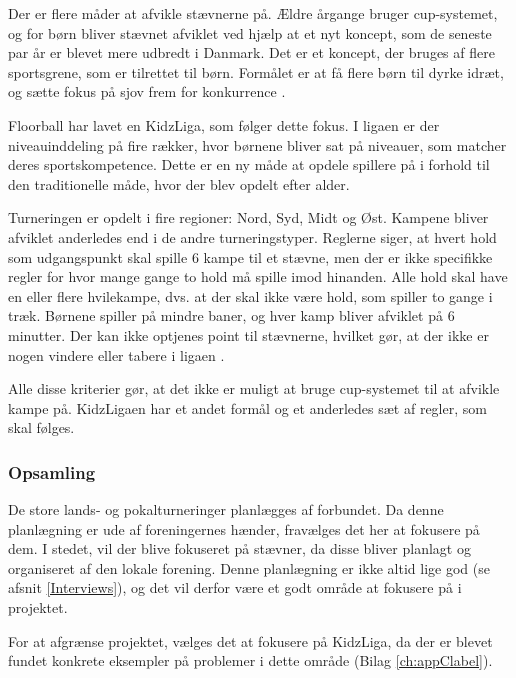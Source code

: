 Der er flere måder at afvikle stævnerne på. Ældre årgange bruger cup-systemet, og for børn bliver stævnet afviklet ved hjælp at et nyt koncept, som de seneste par år er blevet mere udbredt i Danmark. Det er et koncept, der bruges af flere sportsgrene, som er tilrettet til børn. Formålet er at få flere børn til dyrke idræt, og sætte fokus på sjov frem for konkurrence \citep{kidzRegler}.
\par
Floorball har lavet en KidzLiga, som følger dette fokus. I ligaen er der niveauinddeling på fire rækker, hvor børnene bliver sat på niveauer, som matcher deres sportskompetence. Dette er en ny måde at opdele spillere på i forhold til den traditionelle måde, hvor der blev opdelt efter alder.
\par
Turneringen er opdelt i fire regioner: Nord, Syd, Midt og Øst. Kampene bliver afviklet anderledes end i de andre turneringstyper. Reglerne siger, at hvert hold som udgangspunkt skal spille 6 kampe til et stævne, men der er ikke specifikke regler for hvor mange gange to hold må spille imod hinanden. Alle hold skal have en eller flere hvilekampe, dvs. at der skal ikke være hold, som spiller to gange i træk. Børnene spiller på mindre baner, og hver kamp bliver afviklet på 6 minutter. Der kan ikke optjenes point til stævnerne, hvilket gør, at der ikke er nogen vindere eller tabere i ligaen \citep{kidzRegler}.
\par
Alle disse kriterier gør, at det ikke er muligt at bruge cup-systemet til at afvikle kampe på. KidzLigaen har et andet formål og et anderledes sæt af regler, som skal følges.

\subsubsection*{Opsamling}
De store lands- og pokalturneringer planlægges af forbundet. Da denne planlægning er ude af foreningernes hænder, fravælges det her at fokusere på dem. I stedet, vil der blive fokuseret på stævner, da disse bliver planlagt og organiseret af den lokale forening. Denne planlægning er ikke altid lige god (se afsnit \ref{Interviews}), og det vil derfor være et godt område at fokusere på i projektet.
\par
For at afgrænse projektet, vælges det at fokusere på KidzLiga, da der er blevet fundet konkrete eksempler på problemer i dette område (Bilag \ref{ch:appClabel}). 

